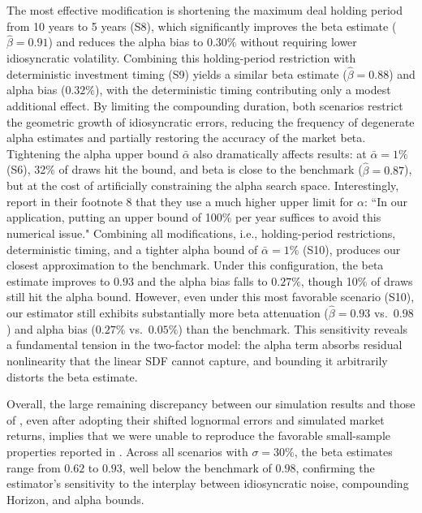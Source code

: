 The most effective modification is shortening the maximum deal holding period from 10 years to 5 years (S8), which significantly improves the beta estimate ($\hat{\beta}=0.91$) and reduces the alpha bias to $0.30\%$ without requiring lower idiosyncratic volatility.
Combining this holding-period restriction with deterministic investment timing (S9) yields a similar beta estimate ($\hat{\beta}=0.88$) and alpha bias ($0.32\%$), with the deterministic timing contributing only a modest additional effect.
By limiting the compounding duration, both scenarios restrict the geometric growth of idiosyncratic errors, reducing the frequency of degenerate alpha estimates and partially restoring the accuracy of the market beta.
Tightening the alpha upper bound $\bar{\alpha}$ also dramatically affects results: at $\bar{\alpha}=1\%$ (S6), 32\% of draws hit the bound, and beta is close to the benchmark ($\hat{\beta}=0.87$), but at the cost of artificially constraining the alpha search space.
Interestingly, \cite{DLP12} report in their footnote 8 that they use a much higher upper limit for $\alpha$: ``In our application, putting an upper bound of 100\% per year suffices to avoid this numerical issue."
Combining all modifications, i.e., holding-period restrictions, deterministic timing, and a tighter alpha bound of $\bar{\alpha}=1\%$ (S10), produces our closest approximation to the benchmark. 
Under this configuration, the beta estimate improves to $0.93$ and the alpha bias falls to $0.27\%$, though 10\% of draws still hit the alpha bound.
However, even under this most favorable scenario (S10), our estimator still exhibits substantially more beta attenuation ($\hat{\beta}=0.93$ vs.\ $0.98$) and alpha bias ($0.27\%$ vs.\ $0.05\%$) than the \cite{DLP12} benchmark.
This sensitivity reveals a fundamental tension in the two-factor model: the alpha term absorbs residual nonlinearity that the linear SDF cannot capture, and bounding it arbitrarily distorts the beta estimate.

Overall, the large remaining discrepancy between our simulation results and those of \cite{DLP12}, even after adopting their shifted lognormal errors and simulated market returns, implies that we were unable to reproduce the favorable small-sample properties reported in \cite{DLP12}.
Across all scenarios with $\sigma=30\%$, the beta estimates range from $0.62$ to $0.93$, well below the \cite{DLP12} benchmark of $0.98$, confirming the estimator's sensitivity to the interplay between idiosyncratic noise, compounding Horizon, and alpha bounds.


